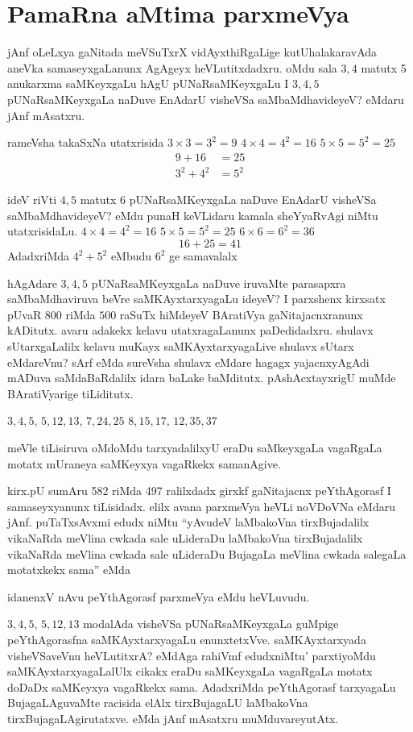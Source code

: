 \chapter{PamaRna aMtima parxmeVya}

jAnf oLeLxya gaNitada meVSuTxrX vidAyxthiRgaLige kutUhalakaravAda aneVka samaseyxgaLanunx AgAgeyx heVLutitxdadxru. oMdu sala $3, 4$ matutx {\rm 5} anukarxma saMKeyxgaLu hAgU pUNaRsaMKeyxgaLu I $3, 4, 5$ pUNaRsaMKeyxgaLa naDuve EnAdarU visheVSa saMbaMdhavideyeV? eMdaru jAnf mAsatxru.

rameVsha takaSxNa utatxrisida \quad $3\times 3=3^2=9$ \quad $4\times 4=4^2=16$ \quad $5\times 5=5^2=25$  
\begin{align*}
9+16 &=25\\
3^2+4^2&=5^2
\end{align*}

ideV riVti $4, 5$ matutx {\rm 6} pUNaRsaMKeyxgaLa naDuve EnAdarU visheVSa saMbaMdhavideyeV? eMdu punaH keVLidaru kamala sheYyaRvAgi niMtu utatxrisidaLu. \quad $4\times 4=4^2=16$ \quad $5\times 5=5^2=25$ \quad $6\times 6=6^2=36$  
$$
16+25 =41
$$
AdadxriMda $4^2+5^2$ eMbudu $6^2$ ge samavalalx

hAgAdare $3, 4, 5$ pUNaRsaMKeyxgaLa naDuve iruvaMte parasapxra saMbaMdhaviruva beVre saMKAyxtarxyagaLu ideyeV? I parxshenx kirxsatx pUvaR $800$ riMda $500$ raSuTx hiMdeyeV BAratiVya gaNitajacnxranunx kADitutx. avaru adakekx kelavu utatxragaLanunx paDedidadxru. shulavx sUtarxgaLalilx kelavu muKayx saMKAyxtarxyagaLive shulavx sUtarx eMdareVnu? sArf eMda sureVsha shulavx eMdare hagagx yajacnxyAgAdi mADuva saMdaBaRdalilx idara baLake baMditutx. pAshAcxtayxrigU muMde BAratiVyarige tiLiditutx.

$3, 4, 5$, \quad $5, 12, 13$, \quad $7, 24, 25$ \quad $8, 15, 17$, \quad $12, 35, 37$

meVle tiLisiruva oMdoMdu tarxyadalilxyU eraDu saMkeyxgaLa vagaRgaLa motatx mUraneya saMKeyxya vagaRkekx samanAgive.

kirx.pU sumAru {\rm 582} riMda {\rm 497} ralilxdadx girxkf gaNitajacnx  peYthAgorasf I samaseyxyanunx tiLisidadx. elilx avana parxmeVya heVLi noVDoVNa eMdaru jAnf. puTaTxsAvxmi edudx niMtu ``yAvudeV laMbakoVna tirxBujadalilx vikaNaRda meVlina cwkada sale uLideraDu laMbakoVna tirxBujadalilx vikaNaRda meVlina cwkada sale uLideraDu BujagaLa meVlina cwkada salegaLa motatxkekx sama'' eMda

idanenxV nAvu peYthAgorasf parxmeVya eMdu heVLuvudu.

 $3, 4, 5$, \quad $5, 12, 13$ modalAda visheVSa pUNaRsaMKeyxgaLa guMpige peYthAgorasfna saMKAyxtarxyagaLu enunxtetxVve. saMKAyxtarxyada visheVSaveVnu heVLutitxrA? eMdAga rahiVmf edudxniMtu' parxtiyoMdu saMKAyxtarxyagaLalUlx cikakx eraDu saMKeyxgaLa vagaRgaLa motatx doDaDx saMKeyxya vagaRkekx sama. AdadxriMda peYthAgorasf tarxyagaLu BujagaLAguvaMte racisida elAlx tirxBujagaLU laMbakoVna tirxBujagaLAgirutatxve. eMda jAnf mAsatxru muMduvareyutAtx.

